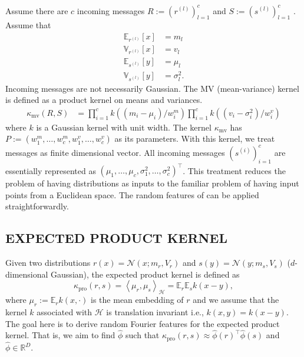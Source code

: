 \documentclass[english]{article}
\theoremstyle{plain}
\theoremstyle{plain}
\begin{document}
Assume there are $c$ incoming messages $R:=\left(r^{(l)}\right)_{l=1}^{c}$ 
and $S:=\left(s^{(l)}\right)_{l=1}^{c}$
. Assume that
\begin{align*}
\mathbb{E}_{r^{(l)}}\left[x\right] & =m_{l}\\
\mathbb{V}_{r^{(l)}}\left[x\right] & =v_{l}\\
\mathbb{E}_{s^{(l)}}\left[y\right] & =\mu_{l}\\
\mathbb{V}_{s^{(l)}}\left[y\right] & =\sigma_{l}^{2}.
\end{align*}
%
Incoming messages are not necessarily Gaussian. 
The MV (mean-variance) kernel is defined as a product
kernel on means and variances. 
\begin{align*}
\kappa_{\text{mv}}\left(R, S\right) 
 &=\prod_{i=1}^{c}k\left(\left(m_{i}-\mu_{i}\right)/w_{i}^{m}\right)\prod_{i=1}^{c}k\left(\left(v_{i}-\sigma_{i}^{2}\right)/w_{i}^{v}\right)
\end{align*}
where $k$ is a Gaussian kernel with unit width. The kernel $\kappa_{\text{mv}}$
has $P:=\left(w_{1}^{m},\ldots,w_{c}^{m},w_{1}^{v},\ldots,w_{c}^{v}\right)$
as its parameters. With this kernel, we treat messages as finite dimensional
vector. All incoming messages $(s^{(i)})_{i=1}^{c}$ are essentially
represented as $\left(\mu_{1},\ldots,\mu_{c},\sigma_{1}^{2},\ldots,\sigma_{c}^{2}\right)^{\top}$.
This treatment reduces the problem of having distributions as inputs
to the familiar problem of having input points from a Euclidean space.
The random features of  can be applied straightforwardly. 

\subsection{EXPECTED PRODUCT KERNEL}
\label{sub:Expected-Product-Kernel}
Given two distributions $r(x)=\mathcal{N}(x;m_{r},V_{r})$ and $s(y)=\mathcal{N}(y;m_{s},V_{s})$
($d$-dimensional Gaussian), the expected product kernel is defined
as 
\[
\kappa_{\text{pro}}(r, s)=\left\langle \mu_{r},\mu_{s}\right\rangle _{\mathcal{H}}=\mathbb{E}_{r}\mathbb{E}_{s}k(x-y),
\]
where $\mu_{r}:=\mathbb{E}_{r}k(x,\cdot)$ is the mean embedding of
$r$ and we assume that the kernel $k$ associated with $\mathcal{H}$
is translation invariant i.e., $k(x,y)=k(x-y)$. The goal here is
to derive random Fourier features for the expected product kernel.
That is, we aim to find $\hat{\phi}$ such that $\kappa_{\text{pro}}(r, s)\approx\hat{\phi}(r)^{\top}\hat{\phi}(s)$
and $\hat{\phi}\in\mathbb{R}^{D}$. 
\end{document}
